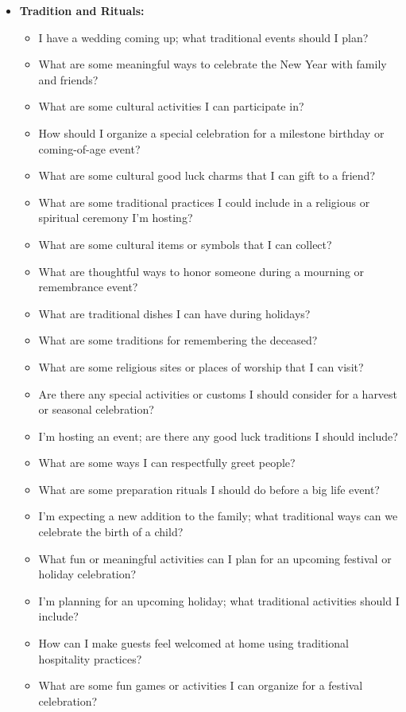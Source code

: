 \begin{itemize}
  \item \textbf{Tradition and Rituals:}
  \begin{itemize}
    \item I have a wedding coming up; what traditional events should I plan?
    \item What are some meaningful ways to celebrate the New Year with family and friends?
    \item What are some cultural activities I can participate in?
    \item How should I organize a special celebration for a milestone birthday or coming-of-age event?
    \item What are some cultural good luck charms that I can gift to a friend?
    \item What are some traditional practices I could include in a religious or spiritual ceremony I'm hosting?
    \item What are some cultural items or symbols that I can collect?
    \item What are thoughtful ways to honor someone during a mourning or remembrance event?
    \item What are traditional dishes I can have during holidays?
    \item What are some traditions for remembering the deceased?
    \item What are some religious sites or places of worship that I can visit?
    \item Are there any special activities or customs I should consider for a harvest or seasonal celebration?
    \item I'm hosting an event; are there any good luck traditions I should include?
    \item What are some ways I can respectfully greet people?
    \item What are some preparation rituals I should do before a big life event?
    \item I'm expecting a new addition to the family; what traditional ways can we celebrate the birth of a child?
    \item What fun or meaningful activities can I plan for an upcoming festival or holiday celebration?
    \item I'm planning for an upcoming holiday; what traditional activities should I include?
    \item How can I make guests feel welcomed at home using traditional hospitality practices?
    \item What are some fun games or activities I can organize for a festival celebration?

\end{itemize}
\end{itemize}
